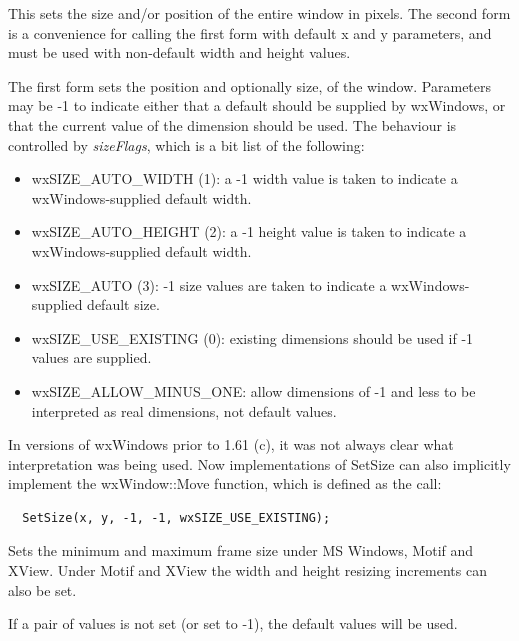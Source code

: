 
This sets the size and/or position of the entire window in pixels.
The second form is a convenience for calling the first form with default
x and y parameters, and must be used with non-default width and height values.

The first form sets the position and optionally size, of the window.
Parameters may be -1 to indicate either that a default should be supplied
by wxWindows, or that the current value of the dimension should be used.
The behaviour is controlled by {\it sizeFlags}, which is a bit list of the
following:

\begin{itemize}
\itemsep=0pt
\item wxSIZE\_AUTO\_WIDTH (1): a -1 width value is taken to indicate
a wxWindows-supplied default width.
\item wxSIZE\_AUTO\_HEIGHT (2): a -1 height value is taken to indicate
a wxWindows-supplied default width.
\item wxSIZE\_AUTO (3): -1 size values are taken to indicate
a wxWindows-supplied default size.
\item wxSIZE\_USE\_EXISTING (0): existing dimensions should be used
if -1 values are supplied.
\item wxSIZE\_ALLOW\_MINUS\_ONE: allow dimensions of -1 and less to be interpreted
as real dimensions, not default values.
\end{itemize}

In versions of wxWindows prior to 1.61 (c), it was not always
clear what interpretation was being used. Now implementations
of SetSize can also implicitly implement the wxWindow::Move function,
which is defined as the call:

\begin{verbatim}
  SetSize(x, y, -1, -1, wxSIZE_USE_EXISTING);
\end{verbatim}



Sets the minimum and maximum frame size under MS Windows, Motif and XView. Under Motif and XView
the width and height resizing increments can also be set.

If a pair of values is not set (or set to -1), the default values will be used.


